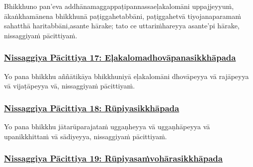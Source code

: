 Bhikkhuno pan'eva addhānamaggappaṭipannassa\makeatletter\hyperlink{endnote194-appendix}\makeatother \thinspace eḷakalomāni uppajjeyyuṁ, ākaṅkhamānena bhikkhunā paṭiggahetabbāni, paṭiggahetvā tiyojanaparamaṁ sahatthā haritabbāni,\makeatletter\hyperlink{endnote195-appendix}\makeatother \thinspace asante hārake; tato ce uttariṁ\makeatletter\hyperlink{endnote196-appendix}\makeatother \thinspace hareyya asante'pi hārake, nissaggiyaṁ pācittiyaṁ.



\subsubsection*{\hyperref[forf-exp17]{Nissaggiya Pācittiya 17: Eḷakalomadhovāpanasikkhāpada}}
\label{np17}

Yo pana bhikkhu aññātikāya bhikkhuniyā eḷakalomāni dhovāpeyya vā rajāpeyya vā vijaṭāpeyya vā, nissaggiyaṁ pācittiyaṁ.



\subsubsection*{\hyperref[forf-exp18]{Nissaggiya Pācittiya 18: Rūpiyasikkhāpada}}
\label{np18}

Yo pana bhikkhu jātarūparajataṁ uggaṇheyya vā uggaṇhāpeyya vā upanikkhittaṁ vā sādiyeyya, nissaggiyaṁ pācittiyaṁ.



\subsubsection*{\hyperref[forf-exp19]{Nissaggiya Pācittiya 19: Rūpiyasaṁvohārasikkhāpada}}
\label{np19}

